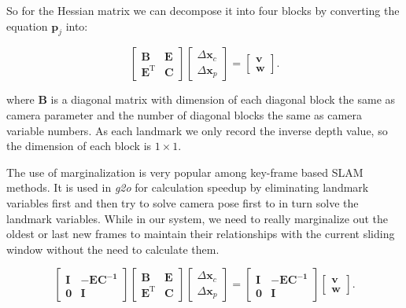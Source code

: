 \documentclass[12pt]{report}   %
\begin{document}
So for the Hessian matrix we can decompose it into four blocks by converting the equation $\mathbf{p}_j$ into:

\begin{equation}
\label{eq:linearequations}
\left[ \begin{matrix}
\bm{B}   &   \bm{E} \\
\bm{E^\mathrm{T}} &   \bm{C}
\end{matrix}\right] 
\left[ \begin{array}{l}
\Delta \bm{x}_c \\
\Delta \bm{x}_p 
\end{array} \right] = 
\left[ \begin{array}{l}
\bm{v} \\
\bm{w} 
\end{array} \right].
\end{equation}

where $\bm{B}$ is a diagonal matrix with dimension of each diagonal block the same as camera parameter and the number of diagonal blocks the same as camera variable numbers. As each landmark we only record the inverse depth value, so the dimension of each block is $1\times1$. 




The use of marginalization is very popular among key-frame based SLAM methods. It is used in \textit{g2o} for calculation speedup by eliminating landmark variables first and then try to solve camera pose first to in turn solve the landmark variables. While in our system, we need to really marginalize out the oldest or last new frames to maintain their relationships with the current sliding window without the need to calculate them.








\begin{equation}\label{eq:guasselimination}
\left[ \begin{matrix}
\bm{I}   &    -\bm{EC^{-1}} \\
\bm{0}	 &	  \bm{I}
\end{matrix}\right]
\left[ \begin{matrix}
\bm{B}   &   \bm{E} \\
\bm{E^\mathrm{T}} &   \bm{C}
\end{matrix}\right] 
\left[ \begin{array}{l}
\Delta \bm{x}_c \\
\Delta \bm{x}_p 
\end{array} \right] = 
\left[ \begin{matrix}
\bm{I}   &    -\bm{EC^{-1}}  \\
\bm{0}	 &	  \bm{I}
\end{matrix}
\right]
\left[ \begin{array}{l}
\bm{v} \\
\bm{w} 
\end{array} \right]  .
\end{equation}
\end{document}
